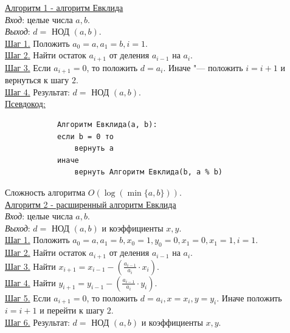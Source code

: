 \documentclass[bachelor, och, labwork]{SCWorks}
\begin{document}
        \underline{Алгоритм 1 - алгоритм Евклида}\\
            \textit{Вход}: целые числа $a, b$.\\
            \textit{Выход}: $d =$ НОД $(a, b)$.\\
            \underline{Шаг 1.} Положить $a_0 = a, a_1 = b, i = 1$.\\
            \underline{Шаг 2.} Найти остаток $a_{i + 1}$ от деления $a_{i - 1}$
            на $a_i$.\\
            \underline{Шаг 3.} Если $a_{i + 1} = 0$, то положить $d = a_i$.
            Иначе "--- положить $i = i + 1$ и вернуться к шагу $2$.\\
            \underline{Шаг 4.} Результат: $d =$ НОД $(a, b)$.\\
            
        \underline{Псевдокод:}
            \begin{verbatim}
            Алгоритм Евклида(a, b):
            если b = 0 то
                вернуть a
            иначе
                вернуть Алгоритм Евклида(b, a % b)        
            \end{verbatim}
            
            Сложность алгоритма $O(\log(\min\{a, b\}))$.\\

        \underline{Алгоритм 2 - расширенный алгоритм Евклида}\\
            \textit{Вход}: целые числа $a, b$.\\
            \textit{Выход}: $d =$ НОД $(a, b)$ и коэффициенты $x, y$.\\
            \underline{Шаг 1.} Положить $a_0 = a, a_1 = b, x_0 = 1, y_0 = 0, x_1
            = 0, x_1 = 1, i = 1$.\\ 
            \underline{Шаг 2.} Найти остаток $a_{i + 1}$ от деления $a_{i - 1}$
            на $a_i$.\\
            \underline{Шаг 3.} Найти $x_{i + 1} = x_{i - 1} - (\frac{a_{i - 1}}{a_i} \cdot x_i)$.\\
            \underline{Шаг 4.} Найти $y_{i + 1} = y_{i - 1} - (\frac{a_{i - 1}}{a_i} \cdot y_i)$.\\
            \underline{Шаг 5.} Если $a_{i + 1} = 0$, то положить $d = a_i, x =
            x_i, y = y_i$. Иначе положить $i = i + 1$ и перейти к шагу $2$.\\
            \underline{Шаг 6.} Результат: $d =$ НОД $(a, b)$ и коэффициенты $x,
            y$.\\
            
\end{document}
